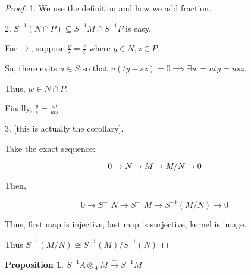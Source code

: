 \documentclass{article}
\theoremstyle{definition}
\newtheorem{proposition}{Proposition}
\begin{document}
\begin{proof}
    1. We use the definition and how we add fraction.

    2. \(S ^{-1} (N \cap P) \subseteq S ^{-1} M \cap S^{-1} P\) is easy.

    For \(\supseteq\), suppose \(\frac{y}{s} = \frac{z}{t}\) where \(y\in N, z\in P\).

    So, there exits \(u\in S\) so that \(u(ty-sz) = 0 \implies \exists w = uty = usz\).

    Thus, \(w\in N \cap P\).

    Finally, \(\frac{y}{s} = \frac{w}{uts}\) 

    3. [this is actually the corollary].

    Take the exact sequence:

    \[
        0 \to N \to M \to M / N \to 0
    \]

    Then,

    \[
        0 \to S ^{-1} N \to S ^{-1} M \to S ^{-1} (M / N) \to 0
    \]

    Thus, first map is injective, last map is surjective, kernel is image.
    
    Thus \(S ^{-1} (M / N) \cong S ^{-1} (M) / S ^{-1} (N)\) 

\end{proof}

\begin{proposition}
    \(S ^{-1} A \otimes _A M \overset{\sim}{\to} S ^{-1} M\) 
\end{proposition}
\end{document}
